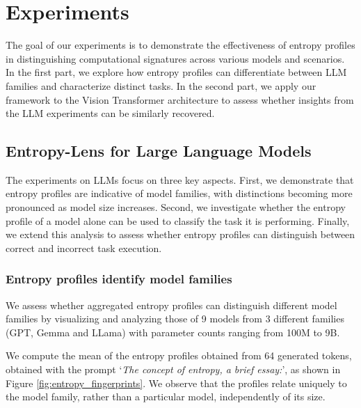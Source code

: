 \section{Experiments} \label{sec:exp}
The goal of our experiments is to demonstrate the effectiveness of entropy profiles in distinguishing computational signatures across various models and scenarios. In the first part, we explore how entropy profiles can differentiate between LLM families and characterize distinct tasks. In the second part, we apply our framework to the Vision Transformer architecture to assess whether insights from the LLM experiments can be similarly recovered.


\subsection{Entropy-Lens for Large Language Models}
The experiments on LLMs focus on three key aspects. First, we demonstrate that entropy profiles are indicative of model families, with distinctions becoming more pronounced as model size increases. Second, we investigate whether the entropy profile of a model alone can be used to classify the task it is performing. Finally, we extend this analysis to assess whether entropy profiles can distinguish between correct and incorrect task execution.

\subsubsection{Entropy profiles identify model families} \label{sec:exp-fingerprint}
We assess whether aggregated entropy profiles can distinguish different model families by visualizing and analyzing those of 9 models from 3 different families (GPT, Gemma and LLama) with parameter counts ranging from 100M to 9B. 

We compute the mean of the entropy profiles obtained from 64 generated tokens, obtained with the prompt `\textit{The concept of entropy, a brief essay:}', as shown in Figure \ref{fig:entropy_fingerprints}.
We observe that the profiles relate uniquely to the model family, rather than a particular model, independently of its size. 

